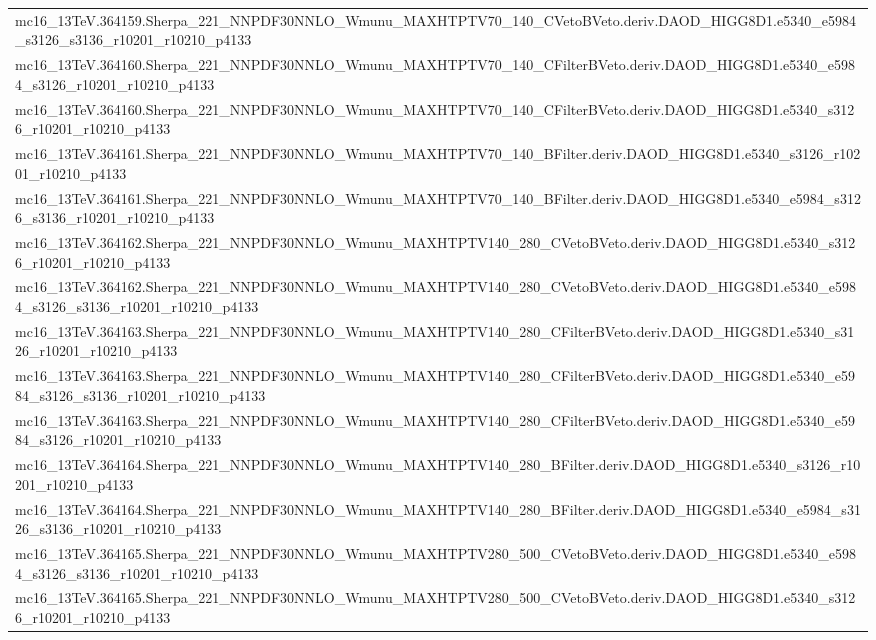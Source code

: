 \begin{adjustwidth}{-3em}{-3em}
\begin{longtable}{l}
mc16\_13TeV.364159.Sherpa\_221\_NNPDF30NNLO\_Wmunu\_MAXHTPTV70\_140\_CVetoBVeto.deriv.DAOD\_HIGG8D1.e5340\_e5984\_s3126\_s3136\_r10201\_r10210\_p4133 \\
mc16\_13TeV.364160.Sherpa\_221\_NNPDF30NNLO\_Wmunu\_MAXHTPTV70\_140\_CFilterBVeto.deriv.DAOD\_HIGG8D1.e5340\_e5984\_s3126\_r10201\_r10210\_p4133 \\
mc16\_13TeV.364160.Sherpa\_221\_NNPDF30NNLO\_Wmunu\_MAXHTPTV70\_140\_CFilterBVeto.deriv.DAOD\_HIGG8D1.e5340\_s3126\_r10201\_r10210\_p4133 \\
mc16\_13TeV.364161.Sherpa\_221\_NNPDF30NNLO\_Wmunu\_MAXHTPTV70\_140\_BFilter.deriv.DAOD\_HIGG8D1.e5340\_s3126\_r10201\_r10210\_p4133 \\
mc16\_13TeV.364161.Sherpa\_221\_NNPDF30NNLO\_Wmunu\_MAXHTPTV70\_140\_BFilter.deriv.DAOD\_HIGG8D1.e5340\_e5984\_s3126\_s3136\_r10201\_r10210\_p4133 \\
mc16\_13TeV.364162.Sherpa\_221\_NNPDF30NNLO\_Wmunu\_MAXHTPTV140\_280\_CVetoBVeto.deriv.DAOD\_HIGG8D1.e5340\_s3126\_r10201\_r10210\_p4133 \\
mc16\_13TeV.364162.Sherpa\_221\_NNPDF30NNLO\_Wmunu\_MAXHTPTV140\_280\_CVetoBVeto.deriv.DAOD\_HIGG8D1.e5340\_e5984\_s3126\_s3136\_r10201\_r10210\_p4133 \\
mc16\_13TeV.364163.Sherpa\_221\_NNPDF30NNLO\_Wmunu\_MAXHTPTV140\_280\_CFilterBVeto.deriv.DAOD\_HIGG8D1.e5340\_s3126\_r10201\_r10210\_p4133 \\
mc16\_13TeV.364163.Sherpa\_221\_NNPDF30NNLO\_Wmunu\_MAXHTPTV140\_280\_CFilterBVeto.deriv.DAOD\_HIGG8D1.e5340\_e5984\_s3126\_s3136\_r10201\_r10210\_p4133 \\
mc16\_13TeV.364163.Sherpa\_221\_NNPDF30NNLO\_Wmunu\_MAXHTPTV140\_280\_CFilterBVeto.deriv.DAOD\_HIGG8D1.e5340\_e5984\_s3126\_r10201\_r10210\_p4133 \\
mc16\_13TeV.364164.Sherpa\_221\_NNPDF30NNLO\_Wmunu\_MAXHTPTV140\_280\_BFilter.deriv.DAOD\_HIGG8D1.e5340\_s3126\_r10201\_r10210\_p4133 \\
mc16\_13TeV.364164.Sherpa\_221\_NNPDF30NNLO\_Wmunu\_MAXHTPTV140\_280\_BFilter.deriv.DAOD\_HIGG8D1.e5340\_e5984\_s3126\_s3136\_r10201\_r10210\_p4133 \\
mc16\_13TeV.364165.Sherpa\_221\_NNPDF30NNLO\_Wmunu\_MAXHTPTV280\_500\_CVetoBVeto.deriv.DAOD\_HIGG8D1.e5340\_e5984\_s3126\_s3136\_r10201\_r10210\_p4133 \\
mc16\_13TeV.364165.Sherpa\_221\_NNPDF30NNLO\_Wmunu\_MAXHTPTV280\_500\_CVetoBVeto.deriv.DAOD\_HIGG8D1.e5340\_s3126\_r10201\_r10210\_p4133 \\

\end{longtable}
\end{adjustwidth}
